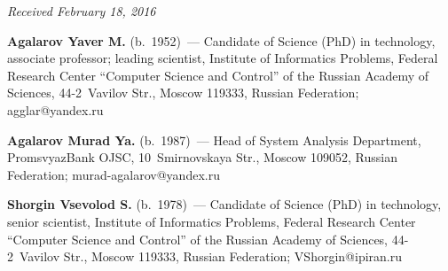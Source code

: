 \vspace*{-3pt}

\hfill{\small\textit{Received February 18, 2016}}
   
  \Contr
  
\noindent
\textbf{Agalarov Yaver M.} (b.\ 1952)~--- Candidate of Science (PhD) in technology, associate 
professor; leading scientist, Institute of Informatics Problems, Federal Research Center ``Computer 
Science and Control'' of the Russian Academy of Sciences, 44-2~Vavilov Str., Moscow 119333, 
Russian Federation; \mbox{agglar@yandex.ru}


\vspace*{3pt}

\noindent
\textbf{Agalarov Murad Ya.} (b.\ 1987)~---
Head of System Analysis Department,
PromsvyazBank OJSC, 10~Smirnovskaya Str., Moscow 109052, Russian
Federation; murad-agalarov@yandex.ru

\vspace*{3pt}

\noindent
\textbf{Shorgin Vsevolod S.} (b.\ 1978)~--- 
Candidate of Science (PhD) in technology, senior scientist, Institute of 
Informatics Problems, Federal Research Center ``Computer Science and Control'' 
of the Russian Academy of Sciences, 44-2~Vavilov Str., Moscow 119333, 
Russian Federation; VShorgin@ipiran.ru 


\label{end\stat}


\renewcommand{\bibname}{\protect\rm Литература}
   
